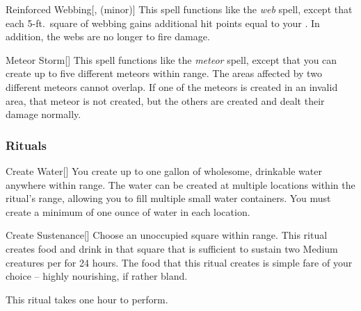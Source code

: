 \lowercase{\hypertarget{spell:Reinforced Webbing}{}}\label{spell:Reinforced Webbing}
\begin{apability}[\nth{3}]{\hypertarget{spell:Reinforced Webbing}{Reinforced Webbing}}[,  (minor)]
This spell functions like the \textit{web} spell, except that each 5-ft.\ square of webbing gains additional hit points equal to your .
In addition, the webs are no longer  to fire damage.
\end{apability}
\vspace{0.25em}



\lowercase{\hypertarget{spell:Meteor Storm}{}}\label{spell:Meteor Storm}
\begin{apability}[\nth{5}]{\hypertarget{spell:Meteor Storm}{Meteor Storm}}[]
This spell functions like the \textit{meteor} spell, except that you can create up to five different meteors within \rnglong range.
The areas affected by two different meteors cannot overlap.
If one of the meteors is created in an invalid area, that meteor is not created, but the others are created and dealt their damage normally.
\end{apability}
\vspace{0.25em}



\subsubsection{Rituals}


\lowercase{\hypertarget{spell:Create Water}{}}\label{spell:Create Water}
\begin{apability}[\nth{1}]{\hypertarget{spell:Create Water}{Create Water}}[]
You create up to one gallon of wholesome, drinkable water anywhere within \rngclose range.
The water can be created at multiple locations within the ritual's range, allowing you to fill multiple small water containers.
You must create a minimum of one ounce of water in each location.
\end{apability}
\vspace{0.25em}



\lowercase{\hypertarget{spell:Create Sustenance}{}}\label{spell:Create Sustenance}
\begin{apability}[\nth{2}]{\hypertarget{spell:Create Sustenance}{Create Sustenance}}[]
Choose an unoccupied square within \rngclose range.
This ritual creates food and drink in that square that is sufficient to sustain two Medium creatures per  for 24 hours.
The food that this ritual creates is simple fare of your choice -- highly nourishing, if rather bland.

This ritual takes one hour to perform.
\end{apability}
\vspace{0.25em}



